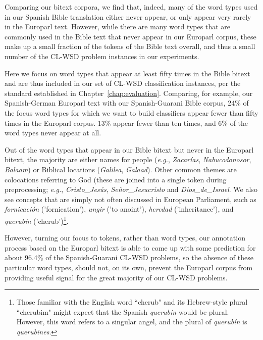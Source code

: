 Comparing our bitext corpora, we find that, indeed, many of the word types used
in our Spanish Bible translation either never appear, or only appear very
rarely in the Europarl text. However, while there are many word types that are
commonly used in the Bible text that never appear in our Europarl corpus, these
make up a small fraction of the tokens of the Bible text overall, and thus a
small number of the CL-WSD problem instances in our experiments.

Here we focus on word types that appear at least fifty times in the Bible
bitext and are thus included in our set of CL-WSD classification instances,
per the standard established in Chapter~\ref{chap:evaluation}.
Comparing, for example, our Spanish-German Europarl text with our
Spanish-Guarani Bible corpus, 24\% of the focus word types for which we want to
build classifiers appear fewer than fifty times in the Europarl corpus. 13\%
appear fewer than ten times, and 6\% of the word types never appear at all.

Out of the word types that appear in our Bible bitext but never in the Europarl
bitext, the majority are either names for people (\emph{e.g.}, \emph{Zacarías},
\emph{Nabucodonosor}, \emph{Balaam}) or Biblical locations (\emph{Galilea},
\emph{Galaad}). Other common themes are colocations referring to God (these are
joined into a single token during preprocessing; \emph{e.g.},
\emph{Cristo\_Jesús}, \emph{Señor\_Jesucristo} and \emph{Dios\_de\_Israel}. We
also see concepts that are simply not often discussed in European Parliament,
such as \emph{fornicación} ('fornication'), \emph{ungir} ('to anoint'),
\emph{heredad} ('inheritance'), and \emph{querubín} ('cherub')\footnote{Those
familiar with the English word ``cherub" and its Hebrew-style plural
``cherubim" might expect that the Spanish \emph{querubín} would be plural.
However, this word refers to a singular angel, and the plural of
\emph{querubín} is \emph{querubines}.}.

However, turning our focus to tokens, rather than word types, our annotation
process based on the Europarl bitext is able to come up with some prediction
for about 96.4\% of the Spanish-Guarani CL-WSD problems, so the absence of
these particular word types, should not, on its own, prevent the Europarl
corpus from providing useful signal for the great majority of our CL-WSD
problems.


